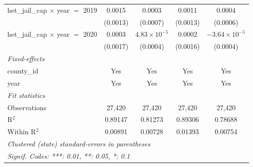 \begin{tabular}{lcccc}
   het\_jail\_cap $\times$ year $=$ 2019                & 0.0015                & 0.0003                    & 0.0011                 & 0.0004\\   
                                                        & (0.0013)              & (0.0007)                  & (0.0013)               & (0.0006)\\   
   het\_jail\_cap $\times$ year $=$ 2020                & 0.0003                & $4.83\times 10^{-5}$      & 0.0002                 & $-3.64\times 10^{-5}$\\    
                                                        & (0.0017)              & (0.0004)                  & (0.0016)               & (0.0004)\\   
   \midrule
   \emph{Fixed-effects}\\
   county\_id                                           & Yes                   & Yes                       & Yes                    & Yes\\  
   year                                                 & Yes                   & Yes                       & Yes                    & Yes\\  
   \midrule
   \emph{Fit statistics}\\
   Observations                                         & 27,420                & 27,420                    & 27,420                 & 27,420\\  
   R$^2$                                                & 0.89147               & 0.81273                   & 0.89306                & 0.78688\\  
   Within R$^2$                                         & 0.00891               & 0.00728                   & 0.01393                & 0.00754\\  
   \midrule \midrule
   \multicolumn{5}{l}{\emph{Clustered (state) standard-errors in parentheses}}\\
   \multicolumn{5}{l}{\emph{Signif. Codes: ***: 0.01, **: 0.05, *: 0.1}}\\
\end{tabular}
\par\endgroup


